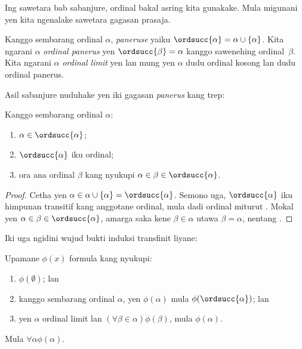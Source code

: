 \documentclass[../../../include/open-logic-section]{subfiles}
\begin{document}

Ing sawetara bab sabanjure, ordinal bakal asring
kita gunakake. Mula migunani yen kita ngenalake
sawetara gagasan prasaja.

\begin{defn}
Kanggo sembarang ordinal $\alpha$, \emph{paneruse}
yaiku $\ordsucc{\alpha} =\alpha \cup \{\alpha\}$.
Kita ngarani $\alpha$ \emph{ordinal panerus} yen
$\ordsucc{\beta} = \alpha$ kanggo sawenehing
ordinal~$\beta$. Kita ngarani $\alpha$ \emph{ordinal
limit} yen lan mung yen $\alpha$ dudu ordinal kosong
lan dudu ordinal panerus.
\end{defn}
\noindent
Asil sabanjure nuduhake yen iki gagasan \emph{panerus}
kang trep:

\begin{prop}
Kanggo sembarang ordinal $\alpha$:
\begin{enumerate}
	\item $\alpha \in \ordsucc{\alpha}$;
	\item $\ordsucc{\alpha}$ iku ordinal;
	\item ora ana ordinal $\beta$ kang nyukupi
	$\alpha \in \beta \in \ordsucc{\alpha}$.
	\end{enumerate}
\end{prop}

\begin{proof}
Cetha yen $\alpha \in \alpha \cup \{\alpha\}
= \ordsucc{\alpha}$. Semono uga,
$\ordsucc{\alpha}$ iku himpunan transitif kang
anggotane ordinal, mula dadi ordinal miturut
. Mokal yen
$\alpha \in \beta \in \ordsucc{\alpha}$,
amarga saka kene $\beta \in \alpha$ utawa
$\beta = \alpha$, nentang .
\end{proof}
\noindent
Iki uga ngidini wujud bukti induksi transfinit liyane:

\begin{thm}
Upamane $\phi(x)$ formula kang nyukupi:
\begin{enumerate}
	\item $\phi(\emptyset)$; lan
	\item kanggo sembarang ordinal $\alpha$, yen
	$\phi(\alpha)$ mula $\phi(\ordsucc{\alpha})$; lan
	\item yen $\alpha$ ordinal limit lan $(\forall \beta \in
	\alpha)\phi(\beta)$, mula $\phi(\alpha)$.
\end{enumerate}
Mula $\forall \alpha \phi(\alpha)$.
\end{thm}
\end{document}
